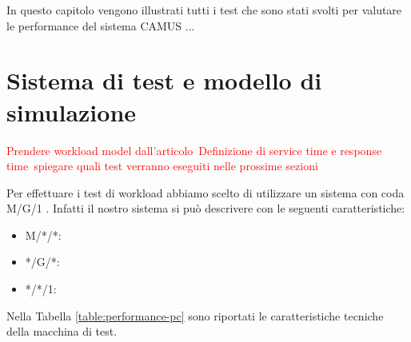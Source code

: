 
In questo capitolo vengono illustrati tutti i test che sono stati svolti per valutare le performance del sistema CAMUS ...

\section{Sistema di test e modello di simulazione}

\textcolor{red}{Prendere workload model dall'articolo\	
	Definizione di service time e response time\
	spiegare quali test verranno eseguiti nelle prossime sezioni}



Per effettuare i test di workload abbiamo scelto di utilizzare un sistema con coda  M/G/1 \cite{sundarapandian2009probability}. Infatti il nostro sistema si può descrivere con le seguenti caratteristiche:

\begin{itemize}
	\item M/*/*: %
	
	\item */G/*: %
	
	\item */*/1: %
\end{itemize}

Nella Tabella \ref{table:performance-pc} sono riportati le caratteristiche tecniche della macchina di test.

\begin{table}[ht]
	\caption{Dati connessione Test tempi risposta a condizioni di rete diverse}
	\label{table:performance-pc}
	\noindent{}
\end{table}

